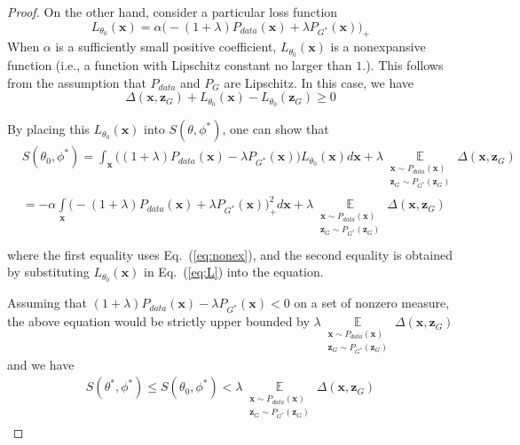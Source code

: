 \documentclass[11pt,fullpage, letterpaper,twoside]{article}
\newcommand{\1}[1]{\mathds{1}_{\left[#1\right]}}
\begin{document}
\begin{proof}
On the other hand, consider a particular loss function
\begin{equation}\label{eq:L}
L_{\theta_0}(\mathbf x)=\alpha\big(-(1+\lambda) P_{data}(\mathbf x)+\lambda P_{G^*}(\mathbf x)\big)_+
\end{equation}
When $\alpha$ is a sufficiently small positive coefficient, $L_{\theta_0}(\mathbf x)$ is a nonexpansive function (i.e., a function with Lipschitz constant no larger than $1$.). This follows from the assumption that  $P_{data}$ and $P_G$ are Lipschitz.  In this case, we have
\begin{equation}\label{eq:nonex}
\Delta(\mathbf x, \mathbf z_G)
+L_{\theta_0}(\mathbf x)-L_{\theta_0}(\mathbf z_G) \geq 0
\end{equation}

By placing this $L_{\theta_0}(\mathbf x)$ into $S(\theta,\phi^*)$, one can show that
\[
\begin{aligned}
&S(\theta_0,\phi^*)
=\int_\mathbf x \big((1+\lambda)P_{data}(\mathbf x)- \lambda P_{G^*}(\mathbf x)\big)L_{\theta_0}(\mathbf x) d\mathbf x
+\lambda \mathop \mathbb E\limits_{\substack{\mathbf x\sim P_{data}(\mathbf x) \\ \mathbf z_G\sim P_{G^*}(\mathbf z_G)}}\Delta(\mathbf x, \mathbf z_G)\\
&=-\alpha\mathop\int\limits_{\mathbf x} \big(-(1+\lambda)P_{data}(\mathbf x)+\lambda P_{G^*}(\mathbf x)\big)_+^2 d\mathbf x
+\lambda \mathop \mathbb E\limits_{\substack{\mathbf x\sim P_{data}(\mathbf x) \\ \mathbf z_G\sim P_{G^*}(\mathbf z_G)}}\Delta(\mathbf x, \mathbf z_G)\\
\end{aligned}
\]
where the first equality uses Eq.~(\ref{eq:nonex}), and the second equality is obtained by substituting  $L_{\theta_0}(\mathbf x)$ in Eq.~(\ref{eq:L}) into the equation.


Assuming that $(1+\lambda)P_{data}(\mathbf x)- \lambda P_{G^*}(\mathbf x)<0$ on a set of nonzero measure, the above equation would be strictly upper bounded by $\lambda \mathop \mathbb E\limits_{\substack{\mathbf x\sim P_{data}(\mathbf x) \\ \mathbf z_G\sim P_{G^*}(\mathbf z_G)}}\Delta(\mathbf x, \mathbf z_G)$ and we have
\begin{equation}
\begin{aligned}
S(\theta^*,\phi^*)\leq S(\theta_0,\phi^*)<\lambda \mathop \mathbb E\limits_{\substack{\mathbf x\sim P_{data}(\mathbf x) \\ \mathbf z_G\sim P_{G^*}(\mathbf z_G)}}\Delta(\mathbf x, \mathbf z_G)
\end{aligned}
\end{equation}


\end{proof}
\end{document}
